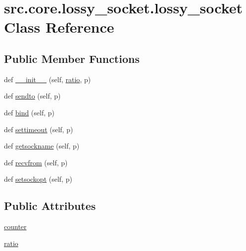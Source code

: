\hypertarget{classsrc_1_1core_1_1lossy__socket_1_1lossy__socket}{}\section{src.\+core.\+lossy\+\_\+socket.\+lossy\+\_\+socket Class Reference}
\label{classsrc_1_1core_1_1lossy__socket_1_1lossy__socket}
\subsection*{Public Member Functions}
\begin{DoxyCompactItemize}
\item 
def \hyperlink{classsrc_1_1core_1_1lossy__socket_1_1lossy__socket_acdb17e6fe730ee39b3ecbe9a223a0f13}{\+\_\+\+\_\+init\+\_\+\+\_\+} (self, \hyperlink{classsrc_1_1core_1_1lossy__socket_1_1lossy__socket_a81b0908197756019eed96bdefbd2318a}{ratio}, p)
\item 
def \hyperlink{classsrc_1_1core_1_1lossy__socket_1_1lossy__socket_ad2847304d2d79d21379c7761b455a248}{sendto} (self, p)
\item 
def \hyperlink{classsrc_1_1core_1_1lossy__socket_1_1lossy__socket_a669395beafad2d3f3268d7b5b8f10d0c}{bind} (self, p)
\item 
def \hyperlink{classsrc_1_1core_1_1lossy__socket_1_1lossy__socket_a4c3abab9c140d0ad8cbcdff130c0aed3}{settimeout} (self, p)
\item 
def \hyperlink{classsrc_1_1core_1_1lossy__socket_1_1lossy__socket_aca63fd75c31bf2388b554fda27bfa0ad}{getsockname} (self, p)
\item 
def \hyperlink{classsrc_1_1core_1_1lossy__socket_1_1lossy__socket_a62eaa5c0db5b03b207c536014c454bed}{recvfrom} (self, p)
\item 
def \hyperlink{classsrc_1_1core_1_1lossy__socket_1_1lossy__socket_a37805321d148b23439497c7155bf0821}{setsockopt} (self, p)
\end{DoxyCompactItemize}
\subsection*{Public Attributes}
\begin{DoxyCompactItemize}
\item 
\hyperlink{classsrc_1_1core_1_1lossy__socket_1_1lossy__socket_a547f97977756be02b80d81b6293804fa}{counter}
\item 
\hyperlink{classsrc_1_1core_1_1lossy__socket_1_1lossy__socket_a81b0908197756019eed96bdefbd2318a}{ratio}
\end{DoxyCompactItemize}
